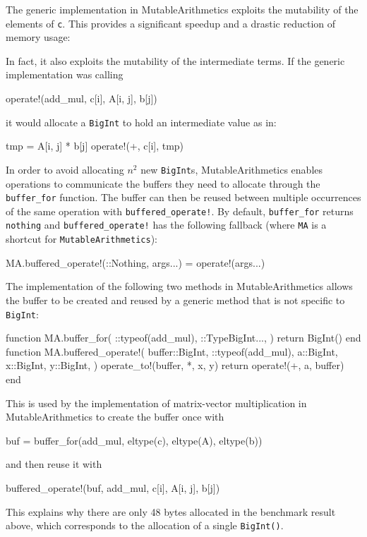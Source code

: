 \documentclass{juliacon}
\newcommand{\ma}{MutableArithmetics}
\begin{document}
The generic implementation in \ma{} exploits the mutability of the elements of \lstinline|c|.
This provides a significant speedup and a drastic reduction of memory usage:

In fact, it also exploits the mutability of the intermediate terms.
If the generic implementation was calling
\begin{jllisting}
operate!(add_mul, c[i], A[i, j], b[j])
\end{jllisting}
it would allocate a \lstinline|BigInt| to hold an intermediate value as in:
\begin{jllisting}
tmp = A[i, j] * b[j]
operate!(+, c[i], tmp)
\end{jllisting}
In order to avoid allocating $n^2$ new \lstinline|BigInt|s,
\ma{} enables operations to communicate the buffers they need to allocate through the \lstinline|buffer_for| function.
The buffer can then be reused between multiple occurrences of the same operation with \lstinline|buffered_operate!|.
By default, \lstinline|buffer_for| returns \lstinline|nothing|
and \lstinline|buffered_operate!| has the following fallback (where \lstinline|MA| is a shortcut for \lstinline|MutableArithmetics|):
\begin{jllisting}
MA.buffered_operate!(::Nothing, args...) = operate!(args...)
\end{jllisting}
The implementation of the following two methods in MutableArithmetics
allows the buffer to be created and reused by a generic method that is not
specific to \lstinline|BigInt|:
\begin{jllisting}
function MA.buffer_for(
    ::typeof(add_mul),
    ::Type{BigInt}...,
)
    return BigInt()
end
function MA.buffered_operate!(
    buffer::BigInt,
    ::typeof(add_mul),
    a::BigInt,
    x::BigInt,
    y::BigInt,
)
    operate_to!(buffer, *, x, y)
    return operate!(+, a, buffer)
end
\end{jllisting}
This is used by the implementation of matrix-vector
multiplication in MutableArithmetics to create the
buffer once with
\begin{jllisting}
buf = buffer_for(add_mul, eltype(c), eltype(A), eltype(b))
\end{jllisting}
and then reuse it with
\begin{jllisting}
buffered_operate!(buf, add_mul, c[i], A[i, j], b[j])
\end{jllisting}
This explains why there are only 48 bytes allocated in the benchmark result above,
which corresponds to the allocation of a single \lstinline|BigInt()|.
\end{document}
